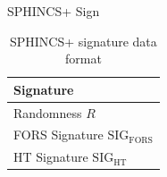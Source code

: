 \begin{subsection}{SPHINCS+ Sign}
\begin{table}[ht]
  \centering
  \begin{tabular}{|l|}
    \hline
    \textbf{Signature}                         \\ \hline
    Randomness \(R\)                         \\ \hline
    FORS Signature \(\mathrm{SIG}_{\mathrm{FORS}}\)        \\ \hline
    HT Signature \(\mathrm{SIG}_{\mathrm{HT}}\)        \\ \hline
  \end{tabular}
  \caption{SPHINCS+ signature data format}
  \label{tab:slh-dsa-format}
\end{table}



\end{subsection}

